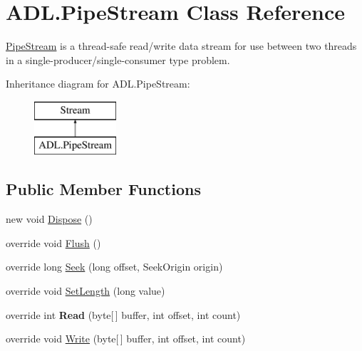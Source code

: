 \hypertarget{class_a_d_l_1_1_pipe_stream}{}\section{A\+D\+L.\+Pipe\+Stream Class Reference}
\label{class_a_d_l_1_1_pipe_stream}


\mbox{\hyperlink{class_a_d_l_1_1_pipe_stream}{Pipe\+Stream}} is a thread-\/safe read/write data stream for use between two threads in a single-\/producer/single-\/consumer type problem.  


Inheritance diagram for A\+D\+L.\+Pipe\+Stream\+:\begin{figure}[H]
\begin{center}
\leavevmode
\includegraphics[height=2.000000cm]{class_a_d_l_1_1_pipe_stream}
\end{center}
\end{figure}
\subsection*{Public Member Functions}
\begin{DoxyCompactItemize}
\item 
new void \mbox{\hyperlink{class_a_d_l_1_1_pipe_stream_a430dca29f0cd1ff4a27fc7bcafbe7a8f}{Dispose}} ()
\item 
override void \mbox{\hyperlink{class_a_d_l_1_1_pipe_stream_aef56d04b8d784d6606ed348971eb29f3}{Flush}} ()
\item 
override long \mbox{\hyperlink{class_a_d_l_1_1_pipe_stream_ae34adb2842a65053e2e13dcb15fe65e5}{Seek}} (long offset, Seek\+Origin origin)
\item 
override void \mbox{\hyperlink{class_a_d_l_1_1_pipe_stream_a66a10533676de87061ae89c0ab2c62c5}{Set\+Length}} (long value)
\item 
\mbox{\label{class_a_d_l_1_1_pipe_stream_ada829c0b71d6896e2bb3cd5d37ccba34}} 
override int {\bfseries Read} (byte\mbox{[}$\,$\mbox{]} buffer, int offset, int count)
\item 
override void \mbox{\hyperlink{class_a_d_l_1_1_pipe_stream_a5f8e6e0a0b7070fc2e5320d2007eadd1}{Write}} (byte\mbox{[}$\,$\mbox{]} buffer, int offset, int count)
\end{DoxyCompactItemize}
